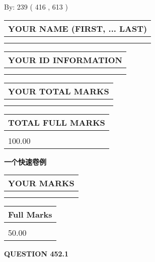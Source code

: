 \documentclass{ctexart}
\begin{document}
   
\hspace{1.0in} By: 
 239 ( 416 ,  613 )
   
   
   
   
\newpage 
\setcounter{page}{ 
   452001 } 
   
   
   
   
\noindent\begin{tabular}{|l|}
\hline
YOUR NAME (FIRST, ... LAST)  \\
\hline
 \\ 
 \\ 
\hline
\end{tabular}
\hspace{0.05in} \begin{tabular}{|l|}
\hline
 YOUR   ID   INFORMATION  \\
\hline
 \\ 
 \\ 
\hline
\end{tabular}
   
   
\vspace{0.2in}\noindent\begin{tabular}{|l|}
\hline
YOUR TOTAL MARKS  \\
\hline
 \\ 
 \\ 
\hline
\end{tabular}
\hspace{0.05in} \begin{tabular}{|l|}
\hline
TOTAL FULL MARKS  \\
\hline
 \\ 
100.00 \\
\hline
\end{tabular}
   
   
 \vspace{0.2in}
{\LARGE {\textbf{ 一个快速卷例}}}
   
   
  
\vspace{0.2in}
  
\noindent\begin{tabular}{|l|}
\hline
 YOUR MARKS  \\
\hline
 \\ 
 \\ 
\hline
\end{tabular}
\hspace{0.05in} \begin{tabular}{|l|}
\hline
 Full Marks  \\
\hline
 \\ 
50.00 \\
\hline
\end{tabular}
{\textbf{\Large{QUESTION
452.1 
}}}
  
\end{document}
